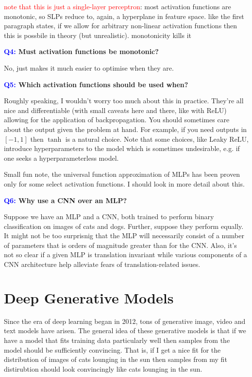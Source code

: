 \documentclass[11pt]{article}
\begin{document}
\textcolor{red}{note that this is just a single-layer perceptron}: most activation functions are monotonic, so SLPs reduce to, again, a hyperplane in feature space. like the first paragraph states, if we allow for arbitrary non-linear activation functions then this is possbile in theory (but unrealistic). monotonicity kills it

\begin{center}
    \textbf{\textcolor{blue}{Q4:} Must activation functions be monotonic?}
\end{center}
No, just makes it much easier to optimise when they are.

\begin{center}
    \textbf{\textcolor{blue}{Q5:} Which activation functions should be used when?}
\end{center}
Roughly speaking, I wouldn't worry too much about this in practice. They're all nice and differentiable (with small caveats here and there, like with ReLU) allowing for the application of backpropagation. You should sometimes care about the output given the problem at hand. For example, if you need outputs in $[-1,1]$ then $\tanh$ is a natural choice. Note that some choices, like Leaky ReLU, introduce hyperparameters to the model which is sometimes undesirable, e.g. if one seeks a hyperparameterless model.

Small fun note, the universal function approximation of MLPs has been proven only for some select activation functions. I should look in more detail about this.

\begin{center}
    \textbf{\textcolor{blue}{Q6:} Why use a CNN over an MLP?}
\end{center}
Suppose we have an MLP and a CNN, both trained to perform binary classification on images of cats and dogs. Further, suppose they perform equally. It might not be too surprisnig that the MLP will necessarily consist of a number of parameters that is orders of magnitude greater than for the CNN. Also, it's not so clear if a given MLP is translation invariant while various components of a CNN architecture help alleviate fears of translation-related issues.

\section{Deep Generative Models}

Since the era of deep learning began in 2012, tons of generative image, video and text models have arisen. The general idea of these generative models is that if we have a model that fits training data particularly well then samples from the model should be sufficiently convincing. That is, if I get a nice fit for the distribution of images of cats lounging in the sun then samples from my fit distirubtion should look convincingly like cats lounging in the sun.
\end{document}
